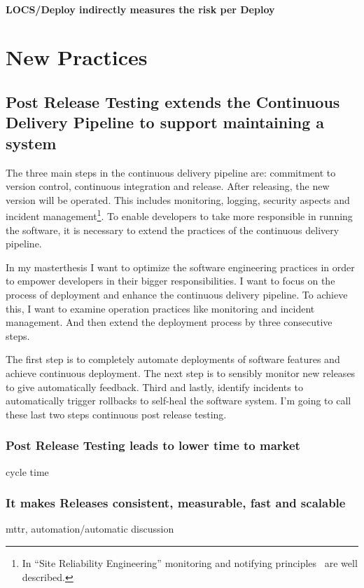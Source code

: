 \subsection{LOCS/Deploy indirectly measures the risk per Deploy}


\part{New Practices}

\chapter{Post Release Testing extends the Continuous Delivery Pipeline to support maintaining a system}

The three main steps in the continuous delivery pipeline are: commitment to version control, continuous integration and release. After releasing, the new version will be operated. This includes monitoring, logging, security aspects and incident management\footnote{In ``Site Reliability Engineering'' monitoring and notifying principles~\cite[p. 55-63]{site_reliability} are well described.}. To enable developers to take more responsible in running the software, it is necessary to extend the practices of the continuous delivery pipeline.

In my masterthesis I want to optimize the software engineering practices in order to empower developers in their bigger responsibilities. I want to focus on the process of deployment and enhance the continuous delivery pipeline. To achieve this, I want to examine operation practices like monitoring and incident management. And then extend the deployment process by three consecutive steps.

The first step is to completely automate deployments of software features and achieve continuous deployment. The next step is to sensibly monitor new releases to give automatically feedback. Third and lastly, identify incidents to automatically trigger rollbacks to self-heal the software system. I'm going to call these last two steps continuous post release testing.

\section{Post Release Testing leads to lower time to market}
cycle time
\section{It makes Releases consistent, measurable, fast and scalable}
mttr, automation/automatic discussion
